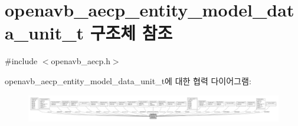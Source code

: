 \hypertarget{structopenavb__aecp__entity__model__data__unit__t}{}\section{openavb\+\_\+aecp\+\_\+entity\+\_\+model\+\_\+data\+\_\+unit\+\_\+t 구조체 참조}
\label{structopenavb__aecp__entity__model__data__unit__t}


{\ttfamily \#include $<$openavb\+\_\+aecp.\+h$>$}



openavb\+\_\+aecp\+\_\+entity\+\_\+model\+\_\+data\+\_\+unit\+\_\+t에 대한 협력 다이어그램\+:
\nopagebreak
\begin{figure}[H]
\begin{center}
\leavevmode
\includegraphics[width=350pt]{structopenavb__aecp__entity__model__data__unit__t__coll__graph}
\end{center}
\end{figure}
